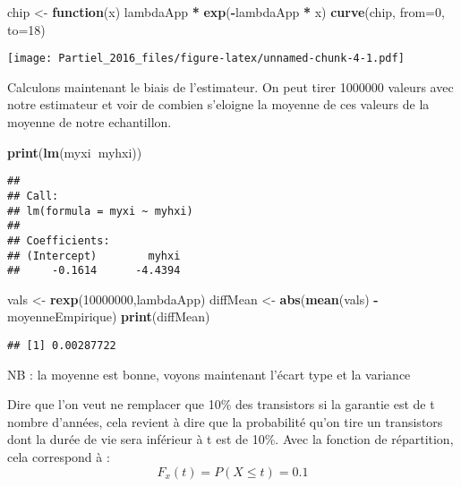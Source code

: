 \documentclass[]{article}
\newenvironment{Shaded}{\begin{snugshade}}{\end{snugshade}}
\newcommand{\KeywordTok}[1]{\textcolor[rgb]{0.13,0.29,0.53}{\textbf{#1}}}
\newcommand{\DataTypeTok}[1]{\textcolor[rgb]{0.13,0.29,0.53}{#1}}
\newcommand{\DecValTok}[1]{\textcolor[rgb]{0.00,0.00,0.81}{#1}}
\newcommand{\StringTok}[1]{\textcolor[rgb]{0.31,0.60,0.02}{#1}}
\newcommand{\ControlFlowTok}[1]{\textcolor[rgb]{0.13,0.29,0.53}{\textbf{#1}}}
\newcommand{\OperatorTok}[1]{\textcolor[rgb]{0.81,0.36,0.00}{\textbf{#1}}}
\newcommand{\NormalTok}[1]{#1}
\begin{document}
\begin{Shaded}
\begin{Highlighting}[]
\NormalTok{chip <-}\StringTok{ }\ControlFlowTok{function}\NormalTok{(x) lambdaApp }\OperatorTok{*}\StringTok{ }\KeywordTok{exp}\NormalTok{(}\OperatorTok{-}\NormalTok{lambdaApp }\OperatorTok{*}\StringTok{ }\NormalTok{x)}
\KeywordTok{curve}\NormalTok{(chip, }\DataTypeTok{from=}\DecValTok{0}\NormalTok{, }\DataTypeTok{to=}\DecValTok{18}\NormalTok{)}
\end{Highlighting}
\end{Shaded}

\texttt{[image: Partiel\_2016\_files/figure-latex/unnamed-chunk-4-1.pdf]}

Calculons maintenant le biais de l'estimateur. On peut tirer 1000000
valeurs avec notre estimateur et voir de combien s'eloigne la moyenne de
ces valeurs de la moyenne de notre echantillon.

\begin{Shaded}
\begin{Highlighting}[]
\KeywordTok{print}\NormalTok{(}\KeywordTok{lm}\NormalTok{(myxi}\OperatorTok{~}\NormalTok{myhxi))}
\end{Highlighting}
\end{Shaded}

\begin{verbatim}
## 
## Call:
## lm(formula = myxi ~ myhxi)
## 
## Coefficients:
## (Intercept)        myhxi  
##     -0.1614      -4.4394
\end{verbatim}

\begin{Shaded}
\begin{Highlighting}[]
\NormalTok{vals <-}\StringTok{ }\KeywordTok{rexp}\NormalTok{(}\DecValTok{10000000}\NormalTok{,lambdaApp)}
\NormalTok{diffMean <-}\StringTok{ }\KeywordTok{abs}\NormalTok{(}\KeywordTok{mean}\NormalTok{(vals) }\OperatorTok{-}\StringTok{ }\NormalTok{moyenneEmpirique)}
\KeywordTok{print}\NormalTok{(diffMean)}
\end{Highlighting}
\end{Shaded}

\begin{verbatim}
## [1] 0.00287722
\end{verbatim}

NB : la moyenne est bonne, voyons maintenant l'écart type et la variance

Dire que l'on veut ne remplacer que 10\% des transistors si la garantie
est de t nombre d'années, cela revient à dire que la probabilité qu'on
tire un transistors dont la durée de vie sera inférieur à t est de 10\%.
Avec la fonction de répartition, cela correspond à :
\[F_x(t) = P(X \leq t) = 0.1\]
\end{document}
